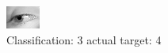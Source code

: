 \begin{figure}[h!]
\begin{center}
\includegraphics[width=0.60\columnwidth]{figures/ID3058_class_3_target_4.png}
\end{center}
\caption{ Classification: 3 actual target: 4}
\label{fig:ID3058_class_3_target_4}
\end{figure}
